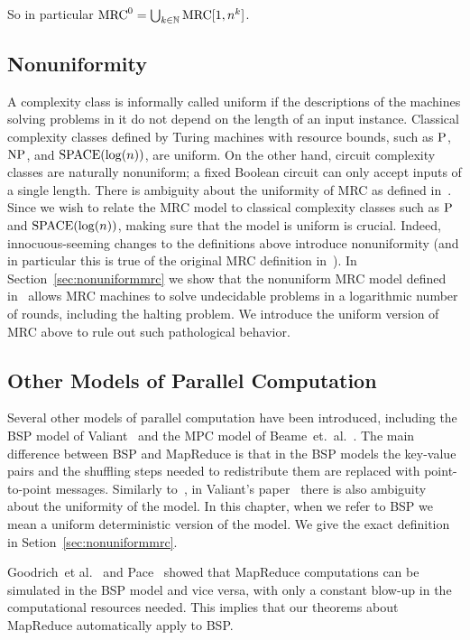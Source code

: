 So in particular $\mrc^0=\bigcup_{k\in\N}\text{MRC}[1,n^k]$. 

\subsection{Nonuniformity}  \label{subsec:nonuniformity}

A complexity class is informally called uniform if the descriptions of the
machines solving problems in it do not depend on the length of an input
instance. Classical complexity classes defined by Turing machines with resource
bounds, such as $\P$, $\NP$, and $\Logspace$, are uniform. On the other hand, circuit
complexity classes are naturally nonuniform; a fixed Boolean circuit can only
accept inputs of a single length. There is ambiguity about the uniformity of
MRC as defined in~\cite{Karloff10}. Since we wish to relate the MRC model to
classical complexity classes such as $\P$ and $\Logspace$, making sure that the model
is uniform is crucial. Indeed, innocuous-seeming changes to the definitions
above introduce nonuniformity (and in particular this is true of the original
MRC definition in~\cite{Karloff10}). In Section~\ref{sec:nonuniformmrc} we show
that the nonuniform MRC model defined in~\cite{Karloff10} allows MRC machines
to solve undecidable problems in a logarithmic number of rounds, including the
halting problem. We introduce the uniform version of MRC above to rule out such
pathological behavior.

\subsection{Other Models of Parallel Computation} \label{subsec:bspmodel}

Several other models of parallel computation have been introduced, including
the BSP model of Valiant~\cite{Valiant90} and the MPC model of
Beame~et.~al.~\cite{BeameKS13}.  The main difference between BSP and MapReduce
is that in the BSP models the key-value pairs and the shuffling steps needed to
redistribute them are replaced with point-to-point messages.  Similarly
to~\cite{Karloff10}, in Valiant's paper~\cite{Valiant90} there is also
ambiguity about the uniformity of the model. In this chapter, when we refer to
BSP we mean a uniform deterministic version of the model. We give the exact
definition in Setion~\ref{sec:nonuniformmrc}.

Goodrich~et al.~\cite{GoodrichSZ11} and Pace~\cite{Pace12} showed that
MapReduce computations can be simulated in the BSP model and vice versa, with
only a constant blow-up in the computational resources needed.  This implies
that our theorems about MapReduce automatically apply to BSP.


